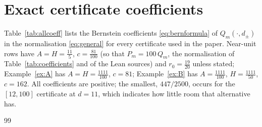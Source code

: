 \documentclass[11pt]{article}
\theoremstyle{plain}
\theoremstyle{definition}
\numberwithin{equation}{section}
\begin{document}
\appendix
\section{Exact certificate coefficients}\label{app:coeff}
Table~\ref{tab:allcoeff} lists the Bernstein coefficients \eqref{eq:bernformula} of
$Q_m(\cdot,d_\pm)$ in the normalisation \eqref{eq:general} for every certificate used
in the paper. Near-unit rows have $A=H=\frac{11}5$, $c=\frac{81}{100}$ (so that
$P_m=100\,Q_m$, the normalisation of Table~\ref{tab:coefficients} and of the Lean
sources) and $r_0=\frac{19}{20}$ unless stated; Example~\ref{ex:A} has
$A=H=\frac{1111}{100}$, $c=81$; Example~\ref{ex:B} has $A=\frac{1111}{100}$,
$H=\frac{1111}{50}$, $c=162$. All coefficients are positive; the smallest, $447/2500$,
occurs for the $[12,100]$ certificate at $d=11$, which indicates how little room
that alternative has.

\begin{table}[ht]
\centering\scriptsize
\renewcommand{\arraystretch}{1.15}\setlength{\tabcolsep}{3pt}
\caption{Bernstein coefficients of all certificates (exact rationals).}
\label{tab:allcoeff}
\resizebox{\linewidth}{!}{}
\end{table}

{\small
\begin{thebibliography}{99}

\end{thebibliography}}
\end{document}
